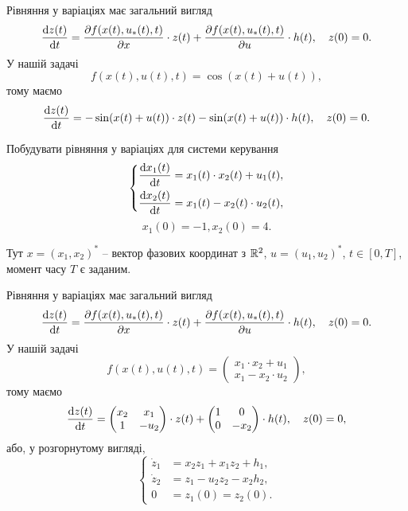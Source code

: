 \begin{solution}
	Рівняння у варіаціях має загальний вигляд \[ \frac{\mathop{}\!\mathrm{d} z(t)}{\mathop{}\!\mathrm{d} t} = \frac{\partial f(x(t),u_*(t),t)}{\partial x} \cdot z(t) + \frac{\partial f(x(t),u_*(t),t)}{\partial u} \cdot h(t), \quad z(0) = 0. \] У нашій задачі \[f(x(t), u(t), t) = \cos(x(t) + u(t)), \] тому маємо \[ \frac{\mathop{}\!\mathrm{d} z(t)}{\mathop{}\!\mathrm{d} t} = -\sin(x(t) + u(t)) \cdot z(t) -\sin(x(t) + u(t)) \cdot h(t), \quad z(0) = 0. \]
\end{solution}

\begin{problem}
	Побудувати рівняння у варіаціях для системи керування \[ \left\{ \begin{aligned}
		\frac{\mathop{}\!\mathrm{d} x_1(t)}{\mathop{}\!\mathrm{d} t} &= x_1(t)\cdot x_2(t) + u_1(t), \\
		\frac{\mathop{}\!\mathrm{d} x_2(t)}{\mathop{}\!\mathrm{d} t} &= x_1(t) - x_2(t) \cdot u_2(t),
	\end{aligned} \right. \]
	\[ x_1(0) = -1, x_2 (0) = 4. \]

	Тут $x = (x_1, x_2)^*$ -- вектор фазових координат з $\mathbb{R}^2$, $u = (u_1, u_2)^*$, $t\in[0, T]$, момент часу $T$ є заданим.
\end{problem}

\begin{solution}
	Рівняння у варіаціях має загальний вигляд \[ \frac{\mathop{}\!\mathrm{d} z(t)}{\mathop{}\!\mathrm{d} t} = \frac{\partial f(x(t),u_*(t),t)}{\partial x} \cdot z(t) + \frac{\partial f(x(t),u_*(t),t)}{\partial u} \cdot h(t), \quad z(0) = 0. \] У нашій задачі \[f(x(t), u(t), t) = \begin{pmatrix} x_1 \cdot x_2 + u_1 \\ x_1 - x_2 \cdot u_2 \end{pmatrix}, \] тому маємо \[ \frac{\mathop{}\!\mathrm{d} z(t)}{\mathop{}\!\mathrm{d} t} = \begin{pmatrix} x_2 & x_1 \\ 1 & -u_2 \end{pmatrix} \cdot z(t) + \begin{pmatrix} 1 & 0 \\ 0 & - x_2 \end{pmatrix} \cdot h(t), \quad z(0) = 0, \] або, у розгорнутому вигляді, \[ \left\{ \begin{aligned}
		\dot z_1 &= x_2 z_1 + x_1 z_2 + h_1, \\
		\dot z_2 &= z_1 - u_2 z_2 - x_2 h_2, \\
		0 &= z_1(0) = z_2(0).
	\end{aligned} \right. \]
\end{solution}

